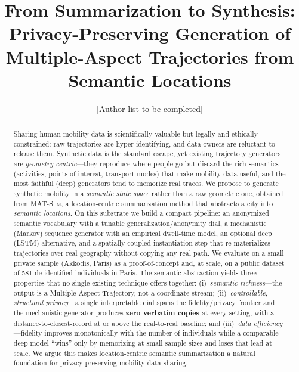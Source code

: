 \documentclass[sigconf,nonacm]{acmart}
\begin{document}
\title{From Summarization to Synthesis: Privacy-Preserving Generation of
Multiple-Aspect Trajectories from Semantic Locations}

\author{[Author list to be completed]}

\renewcommand{\shortauthors}{Draft v0.1}

\begin{abstract}
Sharing human-mobility data is scientifically valuable but legally and ethically constrained: raw
trajectories are hyper-identifying, and data owners are reluctant to release them. Synthetic data is
the standard escape, yet existing trajectory generators are \emph{geometry-centric}---they reproduce
where people go but discard the rich semantics (activities, points of interest, transport modes) that
make mobility data useful, and the most faithful (deep) generators tend to memorize real traces. We
propose to generate synthetic mobility in a \emph{semantic state space} rather than a raw geometric
one, obtained from \textsc{MAT-Sum}, a location-centric summarization method that abstracts a city
into \emph{semantic locations}. On this substrate we build a compact pipeline: an anonymized semantic
vocabulary with a tunable generalization/anonymity dial, a mechanistic (Markov) sequence generator
with an empirical dwell-time model, an optional deep (LSTM) alternative, and a spatially-coupled
instantiation step that re-materializes trajectories over real geography without copying any real
path. We evaluate on a small private sample (Akkodis, Paris) as a proof-of-concept and, at scale, on
a public dataset of 581 de-identified individuals in Paris. The semantic abstraction yields three
properties that no single existing technique offers together: (i)~\emph{semantic richness}---the
output is a Multiple-Aspect Trajectory, not a coordinate stream; (ii)~\emph{controllable, structural
privacy}---a single interpretable dial spans the fidelity/privacy frontier and the mechanistic
generator produces \textbf{zero verbatim copies} at every setting, with a distance-to-closest-record
at or above the real-to-real baseline; and (iii)~\emph{data efficiency}---fidelity improves
monotonically with the number of individuals while a comparable deep model ``wins'' only by memorizing
at small sample sizes and loses that lead at scale. We argue this makes location-centric semantic
summarization a natural foundation for privacy-preserving mobility-data sharing.
\end{abstract}
\end{document}
